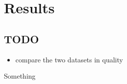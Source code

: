 
\clearpage
\section{Results}

\subsection{TODO}

\begin{itemize}
  \item compare the two datasets in quality
\end{itemize}


Something
